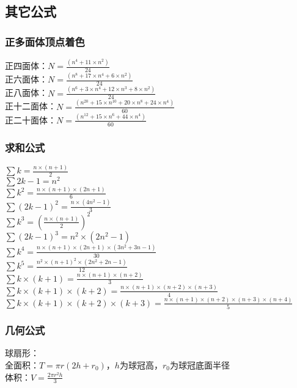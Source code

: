 \subsection{其它公式}
    \subsubsection{正多面体顶点着色}
	正四面体：$N = \frac{(n^{4}+11\times n^{2})}{24}$\\
	正六面体：$N = \frac{(n^{8}+17\times n^{4}+6\times n^{2})}{24}$\\
	正八面体：$N = \frac{(n^{6}+3\times n^{4}+12\times n^{3}+8\times n^{2})}{24}$\\
	正十二面体：$N = \frac{(n^{20}+15\times n^{10}+20\times n^{8}+24\times n^{4})}{60}$\\
	正二十面体：$N = \frac{(n^{12}+15\times n^{6}+44\times n^{4})}{60}$\\
    \subsubsection{求和公式}
	$\sum{k} = \frac{n\times (n+1)}{2}$\\
	$\sum{2k-1} = n^{2}$\\
	$\sum{k^{2}} = \frac{n\times (n+1)\times (2n+1)}{6}$\\
	$\sum{(2k-1)^{2}} = \frac{n\times (4n^{2}-1)}{3}$\\
	$\sum{k^{3}} = (\frac{n\times (n+1)}{2})^{2}$\\
	$\sum{(2k-1)^{3}} = n^{2}\times (2n^{2}-1)$\\
	$\sum{k^{4}} = \frac{n\times (n+1)\times (2n+1)\times (3n^{2}+3n-1)}{30}$\\
	$\sum{k^{5}} = \frac{n^{2}\times (n+1)^{2}\times (2n^{2}+2n-1)}{12}$\\
	$\sum{k\times (k+1)} = \frac{n\times (n+1)\times (n+2)}{3}$\\
	$\sum{k\times (k+1)\times (k+2)} = \frac{n\times (n+1)\times (n+2)\times (n+3)}{4}$\\
	$\sum{k\times (k+1)\times (k+2)\times (k+3)} = \frac{n\times (n+1)\times (n+2)\times (n+3)\times (n+4)}{5}$\\
    \subsubsection{几何公式}
	球扇形：\\
	全面积：$T = \pi r(2h+r_0)$，$h$为球冠高，$r_0$为球冠底面半径\\
	体积：$V = \frac{2\pi r^{2}h}{3}$\\
